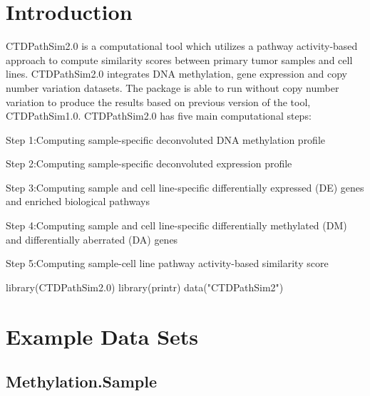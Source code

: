 \documentclass[]{article}
\author{By Banabithi Bose}
\date{4/10/2022}
\newcommand{\hlnum}[1]{\textcolor[rgb]{0.816,0.125,0.439}{#1}}%
\newcommand{\hlstr}[1]{\textcolor[rgb]{0.251,0.627,0.251}{#1}}%
\newcommand{\hlstd}[1]{\textcolor[rgb]{0.251,0.251,0.251}{#1}}%
\newenvironment{Shaded}{\begin{myshaded}}{\end{myshaded}}
\newcommand{\FloatTok}[1]{\hlnum{#1}}
\newcommand{\StringTok}[1]{\hlstr{#1}}
\newcommand{\FunctionTok}[1]{\hlstd{#1}}
\newcommand{\NormalTok}[1]{\hlstd{#1}}
\begin{document}
\maketitle


{
\setcounter{tocdepth}{2}
\tableofcontents
\newpage
}
\hypertarget{introduction}{%
\section{\texorpdfstring{ Introduction}{ Introduction}}\label{introduction}}

CTDPathSim2.0 is a computational tool which utilizes a pathway activity-based approach to compute similarity scores between primary tumor samples and cell lines. CTDPathSim2.0 integrates DNA methylation, gene expression and copy number variation datasets. The package is able to run without copy number variation to produce the results based on previous version of the tool, CTDPathSim1.0. CTDPathSim2.0 has five main computational steps:

Step 1:Computing sample-specific deconvoluted DNA methylation profile

Step 2:Computing sample-specific deconvoluted expression profile

Step 3:Computing sample and cell line-specific differentially expressed (DE) genes and enriched biological pathways

Step 4:Computing sample and cell line-specific differentially methylated (DM) and differentially aberrated (DA) genes

Step 5:Computing sample-cell line pathway activity-based similarity score

\begin{Shaded}
\begin{Highlighting}[]
\FunctionTok{library}\NormalTok{(CTDPathSim2}\FloatTok{.0}\NormalTok{)}
\FunctionTok{library}\NormalTok{(printr)}
\FunctionTok{data}\NormalTok{(}\StringTok{"CTDPathSim2"}\NormalTok{)}
\end{Highlighting}
\end{Shaded}

\hypertarget{example-data-sets}{%
\section{\texorpdfstring{ Example Data Sets}{  Example Data Sets}}\label{example-data-sets}}

\hypertarget{methylation.sample}{%
\subsection{\texorpdfstring{ Methylation.Sample}{  Methylation.Sample}}\label{methylation.sample}}
\end{document}
